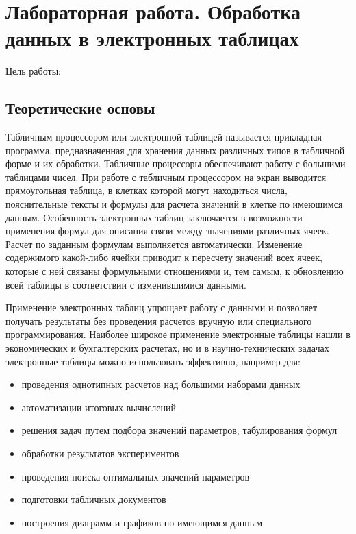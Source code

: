 \documentclass[a4paper]{article}
\begin{document}
\section{Лабораторная работа. Обработка данных в электронных таблицах}

Цель работы:

\subsection{Теоретические основы}

Табличным процессором или электронной таблицей называется прикладная программа, предназначенная для хранения данных различных типов в табличной форме и их обработки. Табличные процессоры обеспечивают работу с большими таблицами чисел. При работе с табличным процессором на экран выводится прямоугольная таблица, в клетках которой могут находиться числа, пояснительные тексты и формулы для расчета значений в клетке по имеющимся данным. Особенность электронных таблиц заключается в возможности применения формул для описания связи между значениями различных ячеек. Расчет по заданным формулам выполняется автоматически. Изменение содержимого какой-либо ячейки приводит к пересчету значений всех ячеек, которые с ней связаны формульными отношениями и, тем самым, к обновлению всей таблицы в соответствии с изменившимися данными.

Применение электронных таблиц упрощает работу с данными и позволяет получать результаты без проведения расчетов вручную или специального программирования. Наиболее широкое применение электронные таблицы нашли в экономических и бухгалтерских расчетах, но и в научно-технических задачах электронные таблицы можно использовать эффективно, например для:

\begin{itemize}

  \item проведения однотипных расчетов над большими наборами данных
  \item автоматизации итоговых вычислений
  \item решения задач путем подбора значений параметров, табулирования формул
  \item обработки результатов экспериментов
  \item проведения поиска оптимальных значений параметров
  \item подготовки табличных документов
  \item построения диаграмм и графиков по имеющимся данным

\end{itemize}
\end{document}
